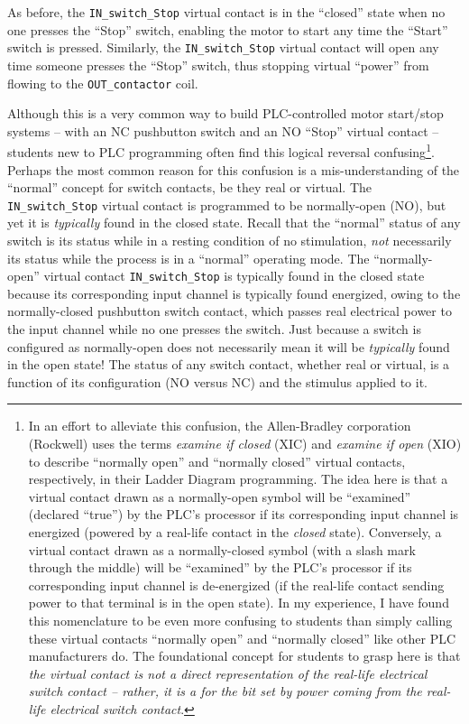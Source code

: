 As before, the \texttt{IN\_switch\_Stop} virtual contact is in the ``closed'' state when no one presses the ``Stop'' switch, enabling the motor to start any time the ``Start'' switch is pressed.  Similarly, the \texttt{IN\_switch\_Stop} virtual contact will open any time someone presses the ``Stop'' switch, thus stopping virtual ``power'' from flowing to the \texttt{OUT\_contactor} coil.

Although this is a very common way to build PLC-controlled motor start/stop systems -- with an NC pushbutton switch and an NO ``Stop'' virtual contact -- students new to PLC programming often find this logical reversal confusing\footnote{In an effort to alleviate this confusion, the Allen-Bradley corporation (Rockwell) uses the terms \textit{examine if closed} (XIC) and \textit{examine if open} (XIO) to describe ``normally open'' and ``normally closed'' virtual contacts, respectively, in their Ladder Diagram programming.  The idea here is that a virtual contact drawn as a normally-open symbol will be ``examined'' (declared ``true'') by the PLC's processor if its corresponding input channel is energized (powered by a real-life contact in the \textit{closed} state).  Conversely, a virtual contact drawn as a normally-closed symbol (with a slash mark through the middle) will be ``examined'' by the PLC's processor if its corresponding input channel is de-energized (if the real-life contact sending power to that terminal is in the open state).  In my experience, I have found this nomenclature to be even more confusing to students than simply calling these virtual contacts ``normally open'' and ``normally closed'' like other PLC manufacturers do.  The foundational concept for students to grasp here is that \textit{the virtual contact is not a direct representation of the real-life electrical switch contact -- rather, it is a  for the bit set by power coming from the real-life electrical switch contact}.}.  Perhaps the most common reason for this confusion is a mis-understanding of the ``normal'' concept for switch contacts, be they real or virtual.  The \texttt{IN\_switch\_Stop} virtual contact is programmed to be normally-open (NO), but yet it is \textit{typically} found in the closed state.  Recall that the ``normal'' status of any switch is its status while in a resting condition of no stimulation, \textit{not} necessarily its status while the process is in a ``normal'' operating mode.  The ``normally-open'' virtual contact \texttt{IN\_switch\_Stop} is typically found in the closed state because its corresponding input channel is typically found energized, owing to the normally-closed pushbutton switch contact, which passes real electrical power to the input channel while no one presses the switch.  Just because a switch is configured as normally-open does not necessarily mean it will be \textit{typically} found in the open state!  The status of any switch contact, whether real or virtual, is a function of its configuration (NO versus NC) and the stimulus applied to it.          

